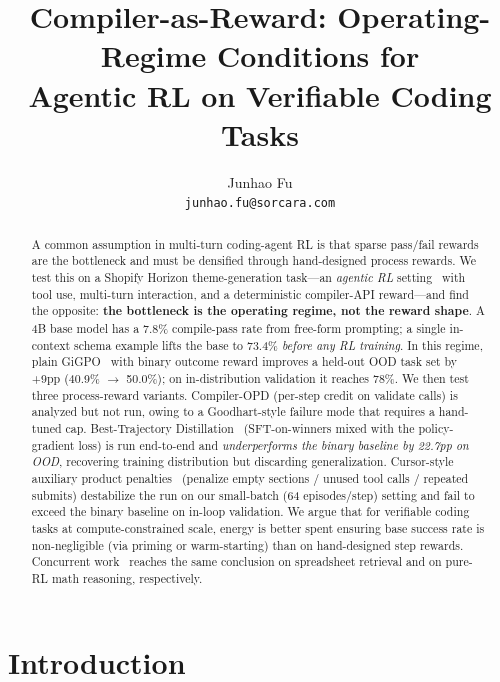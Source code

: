 \documentclass[10pt]{article}
\title{\textbf{Compiler-as-Reward: Operating-Regime Conditions for\\
Agentic RL on Verifiable Coding Tasks}}
\author{
  Junhao Fu \\
  \small{\texttt{junhao.fu@sorcara.com}}
}
\date{}
\begin{document}
\maketitle
\vspace{-10pt}

\begin{abstract}
A common assumption in multi-turn coding-agent RL is that sparse pass/fail rewards
are the bottleneck and must be densified through hand-designed process rewards.
We test this on a Shopify Horizon theme-generation task—an \emph{agentic RL}
setting~\cite{cursor2025composer2,kimi2025k2} with tool use, multi-turn
interaction, and a deterministic compiler-API reward—and find the opposite:
\textbf{the bottleneck is the operating regime, not the reward shape}. A 4B
base model has a 7.8\% compile-pass rate from free-form prompting; a single
in-context schema example lifts the base to 73.4\% \emph{before any RL
training}. In this regime, plain GiGPO~\cite{zeng2025gigpo} with binary outcome
reward improves a held-out OOD task set by +9pp (40.9\% $\to$ 50.0\%); on
in-distribution validation it reaches 78\%. We then test three process-reward
variants. Compiler-OPD (per-step credit on validate calls) is analyzed but not
run, owing to a Goodhart-style failure mode that requires a hand-tuned cap.
Best-Trajectory Distillation~\cite{lambert2025tulu3} (SFT-on-winners mixed
with the policy-gradient loss) is run end-to-end and \emph{underperforms the
binary baseline by 22.7pp on OOD}, recovering training distribution but
discarding generalization. Cursor-style auxiliary product
penalties~\cite{cursor2025composer2} (penalize empty sections / unused tool
calls / repeated submits) destabilize the run on our small-batch (64
episodes/step) setting and fail to exceed the binary baseline on in-loop
validation. We argue that for verifiable coding tasks at compute-constrained
scale, energy is better spent ensuring base success rate is non-negligible
(via priming or warm-starting) than on hand-designed step rewards. Concurrent
work~\cite{ramp2026fastask,hu2025orz} reaches the same conclusion on
spreadsheet retrieval and on pure-RL math reasoning, respectively.
\end{abstract}

\section{Introduction}
\label{sec:intro}
\end{document}
